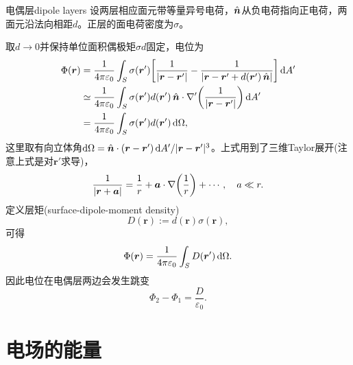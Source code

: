 \begin{example}{电偶层}{dipole layers}
    设两层相应面元带等量异号电荷，$\mathop{}\!\hat{\bm{n}}$从负电荷指向正电荷，两面元沿法向相距$d$。正层的面电荷密度为$\sigma$。
    \begin{notecaptionblock}
        \label{fig:dipole layers}
    \end{notecaptionblock}
    取$d \to 0$并保持单位面积偶极矩$\sigma d$固定，电位为
    \begin{align*}
        \Phi(\bm r) &= \frac1{4\pi\varepsilon_0}\int_S\sigma(\bm r')\biggl[\frac1{\lvert\bm r - \bm r'\rvert} - \frac1{\lvert\bm r - \bm r' + d(\bm r')\mathop{}\!\hat{\bm{n}}\rvert}\biggr]\mathop{}\!\mathrm{d} A'\\
        &\simeq \frac1{4\pi\varepsilon_0}\int_S\sigma(\bm r')d(\bm r')\mathop{}\!\hat{\bm{n}} \cdot \nabla'\biggl(\frac1{\lvert\bm r - \bm r'\rvert}\biggr)\mathop{}\!\mathrm{d} A'\\
        &= \frac1{4\pi\varepsilon_0}\int_S\sigma(\bm r')d(\bm r')\mathop{}\!\mathrm{d}\Omega,
    \end{align*}
    这里取有向立体角$\mathop{}\!\mathrm{d}\Omega = \mathop{}\!\hat{\bm{n}} \cdot (\bm r - \bm r')\mathop{}\!\mathrm{d} A'/\lvert\bm r - \bm r'\rvert^3$。上式用到了三维Taylor展开(注意上式是对$\bm r'$求导)，
    \[
        \frac1{\lvert\bm r + \bm a\rvert} = \frac1r + \bm a \cdot \nabla\biggl(\frac1r\biggr) + \cdots,\quad a \ll r.
    \]
    定义层矩(surface-dipole-moment density) 
    \begin{equation}
        D(\bm r) := d(\bm r)\sigma(\bm r),
    \end{equation}
    可得
    \begin{equation}
        \label{eqn:Phi of dipole layer}
        \Phi(\bm r) = \frac1{4\pi\varepsilon_0}\int_SD(\bm r')\mathop{}\!\mathrm{d}\Omega.
    \end{equation}
    因此电位在电偶层两边会发生跳变
    \begin{equation}
        \Phi_2 - \Phi_1 = \frac D{\varepsilon_0}.
    \end{equation}
\end{example}

\section{电场的能量}

